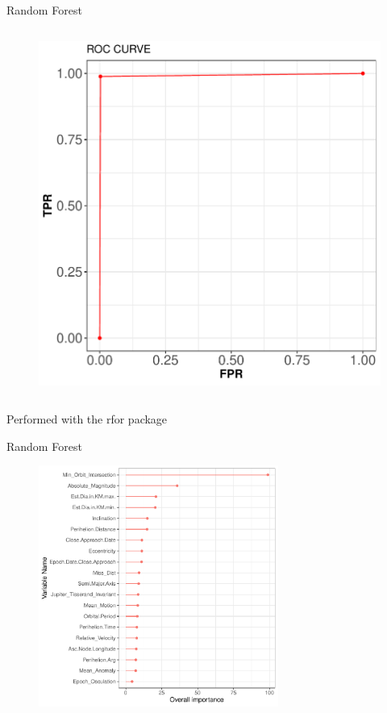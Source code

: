 \documentclass{beamer}
\begin{document}
\begin{frame}{Random Forest}
\begin{columns}
\begin{figure}[b]{\textwidth}
    \includegraphics[width=\textwidth]{Pic/ROC_RF.pdf}
  \end{figure}
\end{columns}
\begin{center}
Performed with the rfor package \cite{rfor}
\end{center}
\end{frame}

\begin{frame}{Random Forest}
  \begin{figure}[b]{\textwidth}
    \includegraphics[width=0.7\textwidth]{Pic/RF_Importance.pdf}
  \end{figure} 
\end{frame}
\end{document}
